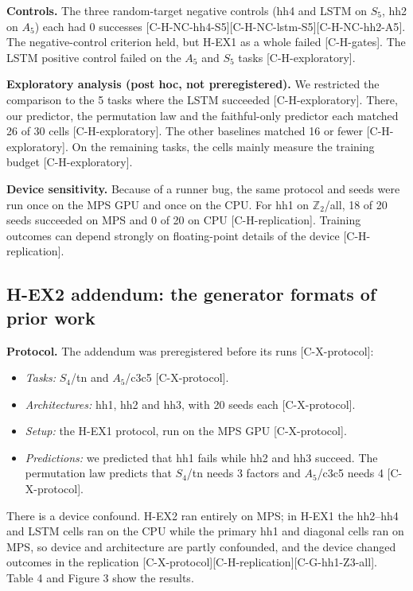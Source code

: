\documentclass[10pt,twocolumn,a4paper]{article}
\providecommand{\tightlist}{\setlength{\itemsep}{0pt}\setlength{\parskip}{0pt}}
\begin{document}
\textbf{Controls.} The three random-target negative controls (hh4 and LSTM on \(S_5\), hh2 on \(A_5\)) each had 0 successes {[}C-H-NC-hh4-S5{]}{[}C-H-NC-lstm-S5{]}{[}C-H-NC-hh2-A5{]}. The negative-control criterion held, but H-EX1 as a whole failed {[}C-H-gates{]}. The LSTM positive control failed on the \(A_5\) and \(S_5\) tasks {[}C-H-exploratory{]}.

\textbf{Exploratory analysis (post hoc, not preregistered).} We restricted the comparison to the 5 tasks where the LSTM succeeded {[}C-H-exploratory{]}. There, our predictor, the permutation law and the faithful-only predictor each matched 26 of 30 cells {[}C-H-exploratory{]}. The other baselines matched 16 or fewer {[}C-H-exploratory{]}. On the remaining tasks, the cells mainly measure the training budget {[}C-H-exploratory{]}.

\textbf{Device sensitivity.} Because of a runner bug, the same protocol and seeds were run once on the MPS GPU and once on the CPU. For hh1 on \(\mathbb{Z}_2\)/all, 18 of 20 seeds succeeded on MPS and 0 of 20 on CPU {[}C-H-replication{]}. Training outcomes can depend strongly on floating-point details of the device {[}C-H-replication{]}.

\subsection{H-EX2 addendum: the generator formats of prior work}\label{h-ex2-addendum-the-generator-formats-of-prior-work}

\textbf{Protocol.} The addendum was preregistered before its runs {[}C-X-protocol{]}:

\begin{itemize}
\tightlist
\item
  \emph{Tasks:} \(S_4\)/tn and \(A_5\)/c3c5 {[}C-X-protocol{]}.
\item
  \emph{Architectures:} hh1, hh2 and hh3, with 20 seeds each {[}C-X-protocol{]}.
\item
  \emph{Setup:} the H-EX1 protocol, run on the MPS GPU {[}C-X-protocol{]}.
\item
  \emph{Predictions:} we predicted that hh1 fails while hh2 and hh3 succeed. The permutation law predicts that \(S_4\)/tn needs 3 factors and \(A_5\)/c3c5 needs 4 {[}C-X-protocol{]}.
\end{itemize}

There is a device confound. H-EX2 ran entirely on MPS; in H-EX1 the hh2--hh4 and LSTM cells ran on the CPU while the primary hh1 and diagonal cells ran on MPS, so device and architecture are partly confounded, and the device changed outcomes in the replication {[}C-X-protocol{]}{[}C-H-replication{]}{[}C-G-hh1-Z3-all{]}. Table 4 and Figure 3 show the results.
\end{document}
